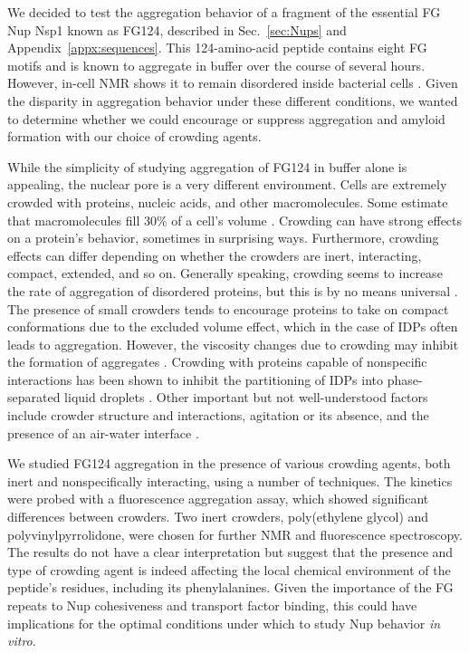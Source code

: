 We decided to test the aggregation behavior of a fragment of the essential FG Nup Nsp1 known as FG124, described in Sec.~\ref{sec:Nups} and Appendix~\ref{appx:sequences}.  This 124-amino-acid peptide contains eight FG motifs and is known to aggregate in buffer over the course of several hours.  However, in-cell NMR shows it to remain disordered inside bacterial cells \cite{hough15}.  Given the disparity in aggregation behavior under these different conditions, we wanted to determine whether we could encourage or suppress aggregation and amyloid formation with our choice of crowding agents.

While the simplicity of studying aggregation of FG124 in buffer alone is appealing, the nuclear pore is a very different environment.  Cells are extremely crowded with proteins, nucleic acids, and other macromolecules.  Some estimate that macromolecules fill 30\% of a cell's volume \cite{breydo14}.  Crowding can have strong effects on a protein's behavior, sometimes in surprising ways.  Furthermore, crowding effects can differ depending on whether the crowders are inert, interacting, compact, extended, and so on.  Generally speaking, crowding seems to increase the rate of aggregation of disordered proteins, but this is by no means universal \cite{breydo15, breydo14,lee12,magno10,milles13}.  The presence of small crowders tends to encourage proteins to take on compact conformations due to the excluded volume effect, which in the case of IDPs often leads to aggregation.  However, the viscosity changes due to crowding may inhibit the formation of aggregates \cite{sleutel12,saha16}.  Crowding with proteins capable of nonspecific interactions has been shown to inhibit the partitioning of IDPs into phase-separated liquid droplets \cite{protter18}.  Other important but not well-understood factors include crowder structure and interactions, agitation or its absence, and the presence of an air-water interface \cite{lee12, breydo14}.

We studied FG124 aggregation in the presence of various crowding agents, both inert and nonspecifically interacting, using a number of techniques.  The kinetics were probed with a fluorescence aggregation assay, which showed significant differences between crowders.  Two inert crowders, poly(ethylene glycol) and polyvinylpyrrolidone, were chosen for further NMR and fluorescence spectroscopy.  The results do not have a clear interpretation but suggest that the presence and type of crowding agent is indeed affecting the local chemical environment of the peptide's residues, including its phenylalanines.  Given the importance of the FG repeats to Nup cohesiveness and transport factor binding, this could have implications for the optimal conditions under which to study Nup behavior \textit{in vitro}.

